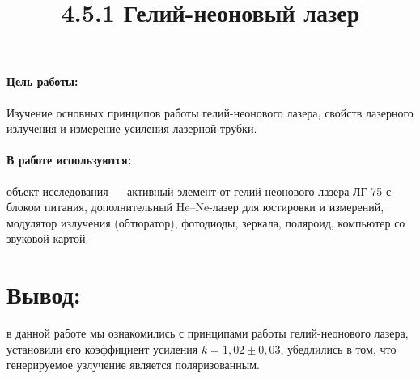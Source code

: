 \documentclass[12pt]{article}
\title{4.5.1 Гелий-неоновый лазер}
\date{}
\begin{document}
\maketitle

\paragraph{Цель работы:}Изучение основных принципов работы гелий-неонового лазера, свойств лазерного излучения и измерение усиления лазерной трубки.

\paragraph{В работе используются:}объект исследования — активный элемент от гелий-неонового лазера ЛГ-75 с блоком питания, дополнительный He–Ne-лазер для юстировки и измерений, модулятор излучения (обтюратор), фотодиоды, зеркала, поляроид, компьютер со звуковой картой.




%
\section*{Вывод:} в данной работе мы ознакомились с принципами работы гелий-неонового лазера, установили его коэффициент усиления $k = 1,02 \pm 0,03$, убедлились в том, что генерируемое узлучение является поляризованным.
\end{document}
